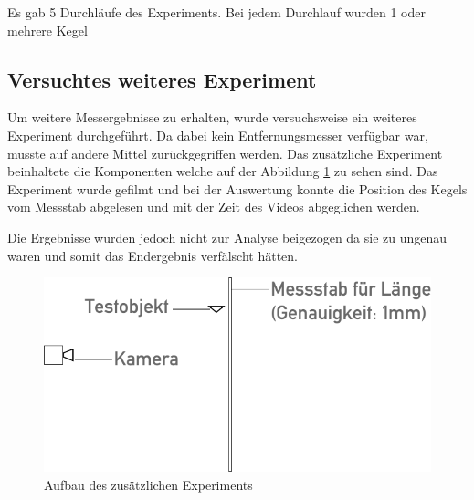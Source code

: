 Es gab 5 Durchläufe des Experiments. Bei jedem Durchlauf wurden 1 oder mehrere Kegel 



\subsection{Versuchtes weiteres Experiment}

Um weitere Messergebnisse zu erhalten, wurde versuchsweise ein weiteres Experiment durchgeführt. Da dabei kein Entfernungsmesser verfügbar war, musste auf andere Mittel zurückgegriffen werden. Das zusätzliche Experiment beinhaltete die Komponenten welche auf der Abbildung \ref{fig:addexp} zu sehen sind. Das Experiment wurde gefilmt und bei der Auswertung konnte die Position des Kegels vom Messstab abgelesen und mit der Zeit des Videos abgeglichen werden.

Die Ergebnisse wurden jedoch nicht zur Analyse beigezogen da sie zu ungenau waren und somit das Endergebnis verfälscht hätten.

\begin{figure}
	\center
	\includegraphics{diagrams/aufbau2}
	\caption{\label{fig:addexp} Aufbau des zusätzlichen Experiments}
\end{figure}
